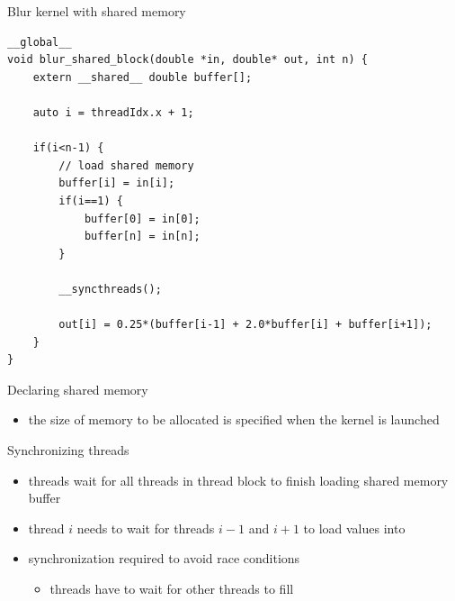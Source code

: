 \begin{frame}[fragile]{}
    \begin{code}{Blur kernel with shared memory}
        \begin{lstlisting}[style=boxcudatiny]
__global__
void blur_shared_block(double *in, double* out, int n) {
    extern __shared__ double buffer[];

    auto i = threadIdx.x + 1;

    if(i<n-1) {
        // load shared memory
        buffer[i] = in[i];
        if(i==1) {
            buffer[0] = in[0];
            buffer[n] = in[n];
        }

        __syncthreads();

        out[i] = 0.25*(buffer[i-1] + 2.0*buffer[i] + buffer[i+1]);
    }
}
        \end{lstlisting}
    \end{code}

\end{frame}

\begin{frame}[fragile]{}
    \begin{info}{Declaring shared memory}
        \centering {}
        \begin{itemize}
            \item the size of memory to be allocated is specified when the kernel is launched
        \end{itemize}
    \end{info}

    \begin{info}{Synchronizing threads}
        \centering {}
        \begin{itemize}
            \item threads wait for all threads in thread block to finish loading shared memory buffer
            \item thread $i$ needs to wait for threads $i-1$ and $i+1$ to load values into 
            \item synchronization required to avoid race conditions
            \begin{itemize}
                \item threads have to wait for other threads to fill 
            \end{itemize}
        \end{itemize}
    \end{info}

\end{frame}

